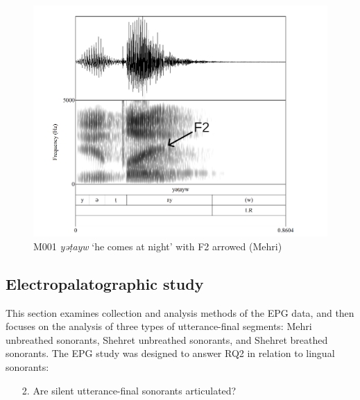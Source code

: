 \documentclass[output=paper]{langscibook}
\begin{document}
\begin{figure}
\includegraphics[height=.4\textheight]{figures/a12Watsonetal-img010.png}
\caption{ \label{fig:watson:10} M001 \textit{yəṭayw} ‘he comes at night’ with F2 arrowed (Mehri)}
\end{figure}

\subsection{Electropalatographic study}  %
\label{sec:watson:4.3}
This section examines collection and analysis methods of the EPG data, and then focuses on the analysis of three types of utterance-final segments: Mehri unbreathed sonorants, Shehret unbreathed sonorants, and Shehret breathed sonorants. The EPG study was designed to answer RQ2 in relation to lingual sonorants:

\begin{enumerate}
  \item[2.] {Are silent utterance-final sonorants articulated?}
\end{enumerate}
\end{document}
